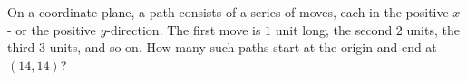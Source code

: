 On a coordinate plane, a path consists of a series of moves, each in the positive $x$- or the positive $y$-direction. The first move is $1$ unit long, the second $2$ units, the third $3$ units, and so on. How many such paths start at the origin and end at $(14,14)$?
